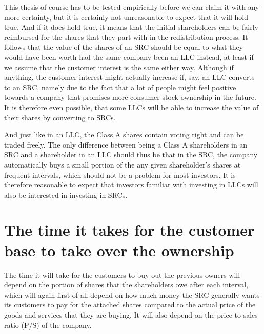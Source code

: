 \documentclass{article}
\begin{document}
This thesis of course has to be tested empirically before we can claim it with any more certainty, but it is certainly not unreasonable to expect that it will hold true.
%
And if it does hold true, it means that the initial shareholders can be fairly reimbursed for the shares that they part with in the redistribution process. It follows that the value of the shares of an SRC should be equal to what they would have been worth had the same company been an LLC instead, at least if we assume that the customer interest is the same either way. Although if anything, the customer interest might actually increase if, say, an LLC converts to an SRC, namely due to the fact that a lot of people might feel positive towards a company that promises more consumer stock ownership in the future. It is therefore even possible, that some LLCs will be able to increase the value of their shares by converting to SRCs.

And just like in an LLC, the Class A shares contain voting right and can be traded freely. The only difference between being a Class A shareholders in an SRC and a shareholder in an LLC should thus be that in the SRC, the company automatically buys a small portion of the any given shareholder's shares at frequent intervals, which should not be a problem for most investors. It is therefore reasonable to expect that investors familiar with investing in LLCs will also be interested in investing in SRCs. 



\section{The time it takes for the customer base to take over the ownership}

The time it will take for the customers to buy out the previous owners will depend on the portion of shares that the shareholders owe after each interval, which will again first of all depend on how much money the SRC generally wants its customers to pay for the attached shares compared to the actual price of the goods and services that they are buying. It will also depend on the price-to-sales ratio (P/S) of the company. 
\end{document}

